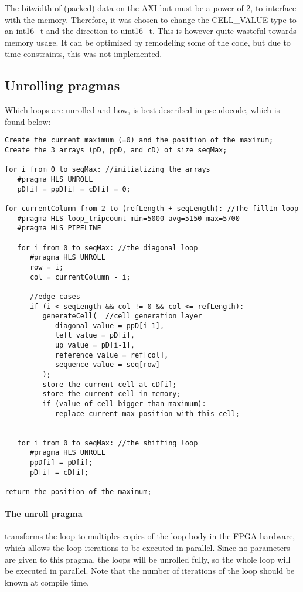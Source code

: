 The bitwidth of (packed) data on the AXI but must be a power of 2, to interface with the memory. Therefore, it was chosen to change the CELL\_VALUE type to an int16\_t and the direction to uint16\_t. This is however quite wasteful towards memory usage. It can be optimized by remodeling some of the code, but due to time constraints, this was not implemented.

\subsection{Unrolling pragmas}
Which loops are unrolled and how, is best described in pseudocode, which is found below:

\begin{lstlisting}
Create the current maximum (=0) and the position of the maximum;
Create the 3 arrays (pD, ppD, and cD) of size seqMax;

for i from 0 to seqMax: //initializing the arrays
   #pragma HLS UNROLL
   pD[i] = ppD[i] = cD[i] = 0;

for currentColumn from 2 to (refLength + seqLength): //The fillIn loop
   #pragma HLS loop_tripcount min=5000 avg=5150 max=5700
   #pragma HLS PIPELINE
	
   for i from 0 to seqMax: //the diagonal loop
      #pragma HLS UNROLL
      row = i;
      col = currentColumn - i;
      
      //edge cases
      if (i < seqLength && col != 0 && col <= refLength):
         generateCell(  //cell generation layer
         	diagonal value = ppD[i-1], 
         	left value = pD[i], 
         	up value = pD[i-1],
         	reference value = ref[col],
         	sequence value = seq[row]
         );
         store the current cell at cD[i];
         store the current cell in memory;
         if (value of cell bigger than maximum):
            replace current max position with this cell;
	
	
   for i from 0 to seqMax: //the shifting loop
      #pragma HLS UNROLL
      ppD[i] = pD[i];
      pD[i] = cD[i];

return the position of the maximum;
\end{lstlisting}

\paragraph{The unroll pragma} transforms the loop to multiples copies of the loop body in the FPGA hardware, which allows the loop iterations to be executed in parallel. Since no parameters are given to this pragma, the loops will be unrolled fully, so the whole loop will be executed in parallel. Note that the number of iterations of the loop should be known at compile time.

